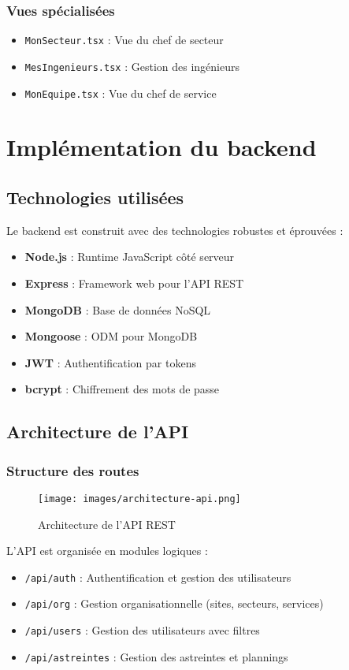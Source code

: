 \subsubsection{Vues spécialisées}
\begin{itemize}
    \item \texttt{MonSecteur.tsx} : Vue du chef de secteur
    \item \texttt{MesIngenieurs.tsx} : Gestion des ingénieurs
    \item \texttt{MonEquipe.tsx} : Vue du chef de service
\end{itemize}

\section{Implémentation du backend}
\subsection{Technologies utilisées}
Le backend est construit avec des technologies robustes et éprouvées :

\begin{itemize}
    \item \textbf{Node.js} : Runtime JavaScript côté serveur
    \item \textbf{Express} : Framework web pour l'API REST
    \item \textbf{MongoDB} : Base de données NoSQL
    \item \textbf{Mongoose} : ODM pour MongoDB
    \item \textbf{JWT} : Authentification par tokens
    \item \textbf{bcrypt} : Chiffrement des mots de passe
\end{itemize}

\subsection{Architecture de l'API}
\subsubsection{Structure des routes}
\begin{figure}[h]
\centering
\texttt{[image: images/architecture-api.png]}
\caption{Architecture de l'API REST}
\label{fig:architecture-api}
\end{figure}

L'API est organisée en modules logiques :
\begin{itemize}
    \item \texttt{/api/auth} : Authentification et gestion des utilisateurs
    \item \texttt{/api/org} : Gestion organisationnelle (sites, secteurs, services)
    \item \texttt{/api/users} : Gestion des utilisateurs avec filtres
    \item \texttt{/api/astreintes} : Gestion des astreintes et plannings
\end{itemize}


